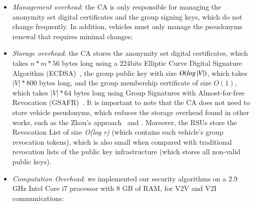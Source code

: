 \documentclass[preprint,12pt]{elsarticle}
\begin{document}
\begin{itemize}
	\item \textit{Management overhead}: the CA is only responsible for managing the anonymity set digital certificates and the group signing keys, which do not change frequently. In addition, vehicles must only manage the pseudonyms renewal that requires minimal changes;

	\item \textit{Storage overhead}: the CA stores the anonymity set digital certificates, which takes $n*m*56$ bytes long using a 224bits Elliptic Curve Digital Signature Algorithm (ECDSA)~\cite{elliptic-curve}, the group public key with size $O(log\thinspace |V|)$, which takes $|V| * 800$ bytes long, and the group membership certificate of size $O (1)$, which takes $|V|*64$ bytes long using Group Signatures with Almost-for-free Revocation (GSAFR)~\cite{libert2012group}. It is important to note that the CA does not need to store vehicle pseudonyms, which reduces the storage overhead found in other works, such as the Zhou's approach~\cite{p2dap2} and \cite{p2dap}. Moreover, the RSUs store the Revocation List of size \textit{O(log r)} (which contains each vehicle's group revocation tokens), which is also small when compared with traditional revocation lists of the public key infrastructure (which stores all non-valid public keys).
	
	
	
	\item \textit{Computation Overhead}: we implemented our security algorithms on a 2.9 GHz Intel Core i7 processor with 8 GB of RAM, for V2V and V2I communications:
	

\end{itemize}
\end{document}
